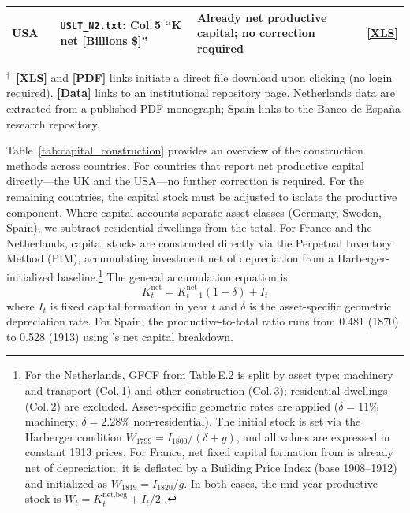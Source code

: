 \documentclass[10pt]{article}
\begin{document}
\begin{table}[!htbp]
\begin{tabular}{p{1.5cm} p{2.8cm} p{4.0cm} p{3.3cm} p{1.3cm}}
USA & \citet{dumenil2013uslt} & \texttt{USLT\_N2.txt}: Col.\,5 ``K net [Billions \$]'' & Already net productive capital; no correction required & \href{https://people.umass.edu/dbasu/Data/DumenilLevyData2016}{[XLS]} \\
\bottomrule
\end{tabular}
\begin{minipage}{\textwidth}
\footnotesize
\medskip
$^{\dagger}$~\textbf{[XLS]} and \textbf{[PDF]} links initiate a direct file download upon clicking (no login required). \textbf{[Data]} links to an institutional repository page. Netherlands data are extracted from a published PDF monograph; Spain links to the Banco de Espa\~na research repository.
\end{minipage}
\end{table}

\par Table~\ref{tab:capital_construction} provides an overview of the construction methods across countries. For countries that report net productive capital directly---the UK and the USA---no further correction is required. For the remaining countries, the capital stock must be adjusted to isolate the productive component. Where capital accounts separate asset classes (Germany, Sweden, Spain), we subtract residential dwellings from the total. For France and the Netherlands, capital stocks are constructed directly via the Perpetual Inventory Method (PIM), accumulating investment net of depreciation from a Harberger-initialized baseline.\footnote{For the Netherlands, GFCF from \citet{SmitsHorlingsZanden2000} Table\,E.2 is split by asset type: machinery and transport (Col.\,1) and other construction (Col.\,3); residential dwellings (Col.\,2) are excluded. Asset-specific geometric rates are applied ($\delta=11\%$ machinery; $\delta=2.28\%$ non-residential). The initial stock is set via the Harberger condition $W_{1799}=I_{1800}/(\delta+g)$, and all values are expressed in constant 1913 prices. For France, net fixed capital formation from \citet{levy2008french} is already net of depreciation; it is deflated by a Building Price Index (base 1908--1912) and initialized as $W_{1819}=I_{1820}/g$. In both cases, the mid-year productive stock is $W_t=K^{\text{net,beg}}_t+I_t/2$ \citep{OECD2009capital}.} The general accumulation equation is:
\begin{equation}
K^{\text{net}}_{t} = K^{\text{net}}_{t-1}(1 - \delta) + I_t
\end{equation}
where $I_t$ is fixed capital formation in year $t$ and $\delta$ is the asset-specific geometric depreciation rate. For Spain, the productive-to-total ratio runs from 0.481 (1870) to 0.528 (1913) using \citet{PradosEscosura2022}'s net capital breakdown.
\end{document}
